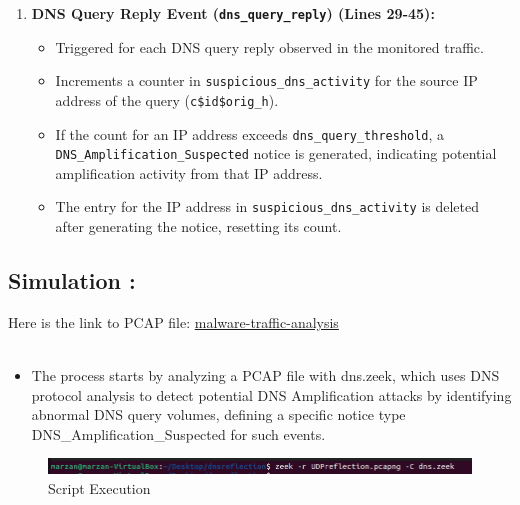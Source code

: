 \begin{enumerate}
  \item \textbf{DNS Query Reply Event (\texttt{dns\_query\_reply})  (Lines 29-45):}
  \begin{itemize}
    \item Triggered for each DNS query reply observed in the monitored traffic.
    \item Increments a counter in \texttt{suspicious\_dns\_activity} for the source IP address of the query (\texttt{c\$id\$orig\_h}).
    \item If the count for an IP address exceeds \texttt{dns\_query\_threshold}, a \texttt{DNS\_Amplification\_Suspected} notice is generated, indicating potential amplification activity from that IP address.
    \item The entry for the IP address in \texttt{suspicious\_dns\_activity} is deleted after generating the notice, resetting its count.
  \end{itemize}


\end{enumerate}


\subsection{Simulation :}
Here is the link to PCAP file:
\href{https://www.malware-traffic-analysis.net/tutorials/index.html}{malware-traffic-analysis}\\\\
\begin{itemize}
    \item The process starts by analyzing a PCAP file with dns.zeek, which uses DNS protocol analysis to detect potential DNS Amplification attacks by identifying abnormal DNS query volumes, defining a specific notice type DNS\_Amplification\_Suspected for such events.
\end{itemize}

\begin{figure}[H]
    \centering
    \includegraphics[width=1\linewidth]{images//UDP_reflection/udp_3.png}
    \caption{Script Execution}
    \label{fig:enter-label}
\end{figure}

